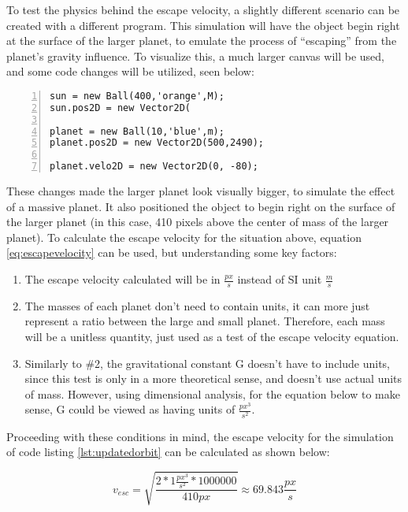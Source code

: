 To test the physics behind the escape velocity, a slightly different scenario can be created with a different program.  This simulation will have the object begin right at the surface of the larger planet, to emulate the process of ``escaping'' from the planet's gravity influence.  To visualize this, a much larger canvas will be used, and some code changes will be utilized, seen below:


\begin{lstlisting}[breaklines=true, frame=single, numbers=left, caption=New conditions for escape velocity simulation, label=lst:changestoorbit]
sun = new Ball(400,'orange',M);
sun.pos2D = new Vector2D(

planet = new Ball(10,'blue',m);
planet.pos2D = new Vector2D(500,2490);

planet.velo2D = new Vector2D(0, -80);
\end{lstlisting}

These changes made the larger planet look visually bigger, to simulate the effect of a massive planet.  It also positioned the object to begin right on the surface of the larger planet (in this case, 410 pixels above the center of mass of the larger planet).  To calculate the escape velocity for the situation above, equation \ref{eq:escapevelocity} can be used, but understanding some key factors:

\begin{enumerate}
\item The escape velocity calculated will be in $\frac{px}{s}$ instead of SI unit $\frac{m}{s}$
\item The masses of each planet don't need to contain units, it can more just represent a ratio between the large and small planet.  Therefore, each mass will be a unitless quantity, just used as a test of the escape velocity equation.
\item Similarly to  \#2, the gravitational constant G doesn't have to include units, since this test is only in a more theoretical sense, and doesn't use actual units of mass.  However, using dimensional analysis, for the equation below to make sense, G could be viewed as having units of $\frac{px^3}{s^2}$.
\end{enumerate}

Proceeding with these conditions in mind, the escape velocity for the simulation of code listing \ref{lst:updatedorbit}
can be calculated as shown below:

\begin{equation}\label{eq:calcvescape}
 v_{esc} = \sqrt{\frac{2*1 \frac{px^3}{s^2}*1000000}{410 px}} \approx 69.843 \frac{px}{s} 
\end{equation}

